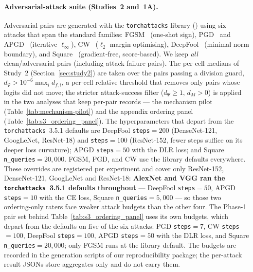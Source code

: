 \paragraph{Adversarial-attack suite (Studies~2 and~1A).}
Adversarial pairs are generated with the \texttt{torchattacks} library
(\citealt{kim2020torchattacks}) using six attacks that span the standard
families: FGSM~\citep{goodfellow2015explaining} (one-shot sign),
PGD~\citep{madry2018towards} and APGD~\citep{croce2020reliable} (iterative
$\ell_\infty$), CW~\citep{carlini2017towards} ($\ell_2$
margin-optimising), DeepFool~\citep{moosavi2016deepfool} (minimal-norm
boundary), and Square~\citep{andriushchenko2020square} (gradient-free,
score-based). We keep \emph{all} clean/adversarial pairs (including
attack-failure pairs). The per-cell medians of Study~2
(Section~\ref{sec:study2}) are taken over the pairs passing a division
guard, $d_\Psi > 10^{-6}\max_i d_{f,i}$, a per-cell relative threshold that
removes only pairs whose logits did not move; the stricter attack-success
filter ($d_\Psi \ge 1$, $d_M > 0$) is applied in the two analyses that keep
per-pair records --- the mechanism pilot
(Table~\ref{tab:mechanism-pilot}) and the appendix ordering panel
(Table~\ref{tab:s3_ordering_panel}).
The hyperparameters that depart from the \texttt{torchattacks}~3.5.1
defaults are DeepFool \texttt{steps}$=200$ (DenseNet-121, GoogLeNet,
ResNet-18) and \texttt{steps}$=100$ (ResNet-152, fewer steps suffice on its
deeper loss curvature); APGD \texttt{steps}$=50$ with the DLR loss; and
Square \texttt{n\_queries}$=20{,}000$. FGSM, PGD, and CW use the library
defaults everywhere. These overrides are registered per experiment and
cover only ResNet-152, DenseNet-121, GoogLeNet and ResNet-18: \textbf{AlexNet
and VGG ran the \texttt{torchattacks}~3.5.1 defaults throughout} --- DeepFool
\texttt{steps}$=50$, APGD \texttt{steps}$=10$ with the CE loss, Square
\texttt{n\_queries}$=5{,}000$ --- so those two ordering-only raters
face weaker attack budgets than the other four. The Phase-1 pair set behind
Table~\ref{tab:s3_ordering_panel} uses its own budgets, which depart from the
defaults on five of the six attacks: PGD \texttt{steps}$=7$, CW
\texttt{steps}$=100$, DeepFool \texttt{steps}$=100$, APGD \texttt{steps}$=50$
with the DLR loss, and Square \texttt{n\_queries}$=20{,}000$; only FGSM runs
at the library default. The budgets are
recorded in the generation scripts of our reproducibility package; the
per-attack result JSONs store aggregates only and do not carry them.

